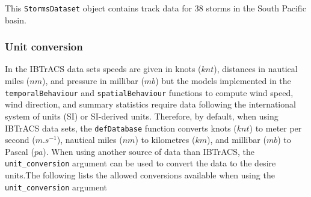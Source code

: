 \documentclass[
]{article}
\newenvironment{Shaded}{\begin{snugshade}}{\end{snugshade}}
\newcommand{\AttributeTok}[1]{\textcolor[rgb]{0.77,0.63,0.00}{#1}}
\newcommand{\ConstantTok}[1]{\textcolor[rgb]{0.00,0.00,0.00}{#1}}
\newcommand{\FunctionTok}[1]{\textcolor[rgb]{0.00,0.00,0.00}{#1}}
\newcommand{\NormalTok}[1]{#1}
\newcommand{\OtherTok}[1]{\textcolor[rgb]{0.56,0.35,0.01}{#1}}
\newcommand{\SpecialCharTok}[1]{\textcolor[rgb]{0.00,0.00,0.00}{#1}}
\newcommand{\StringTok}[1]{\textcolor[rgb]{0.31,0.60,0.02}{#1}}
\begin{document}
\begin{Shaded}
\end{Shaded}

This \texttt{StormsDataset} object contains track data for 38 storms in
the South Pacific basin.

\hypertarget{unit-conversion}{%
\subsubsection{Unit conversion}\label{unit-conversion}}

In the IBTrACS data sets speeds are given in knots (\(knt\)), distances
in nautical miles (\(nm\)), and pressure in millibar (\(mb\)) but the
models implemented in the \texttt{temporalBehaviour} and
\texttt{spatialBehaviour} functions to compute wind speed, wind
direction, and summary statistics require data following the
international system of units (SI) or SI-derived units. Therefore, by
default, when using IBTrACS data sets, the \texttt{defDatabase} function
converts knots (\(knt\)) to meter per second (\(m.s^{-1}\)), nautical
miles (\(nm\)) to kilometres (\(km\)), and millibar (\(mb\)) to Pascal
(\(pa\)). When using another source of data than IBTrACS, the
\texttt{unit\_conversion} argument can be used to convert the data to
the desire units.The following lists the allowed conversions available
when using the \texttt{unit\_conversion} argument
\end{document}
